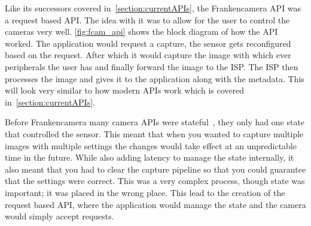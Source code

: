 Like its successors covered in~\cref{section:currentAPIs}, the Frankencamera API
was a request based API. The idea with it was to allow for the user to control
the cameras very well. \cref{fig:fcam_api} shows the block diagram of how the
API worked. The application would request a capture, the sensor gets
reconfigured based on the request. After which it would capture the image with
which ever peripherals the user has and finally forward the image to the ISP.
The ISP then processes the image and gives it to the application along with the
metadata. This will look very similar to how modern APIs work which is covered
in~\cref{section:currentAPIs}.

Before Frankencamera many camera APIs were stateful~\cite{experimentalCompPhot},
they only had one state that controlled the sensor. This meant that when you
wanted to capture multiple images with multiple settings the changes would take
effect at an unpredictable time in the future. While also adding latency to
manage the state internally, it also meant that you had to clear the capture
pipeline so that you could guarantee that the settings were correct. This was a
very complex process, though state was important; it was placed in the wrong
place. This lead to the creation of the request based API, where the
application would manage the state and the camera would simply accept requests.
